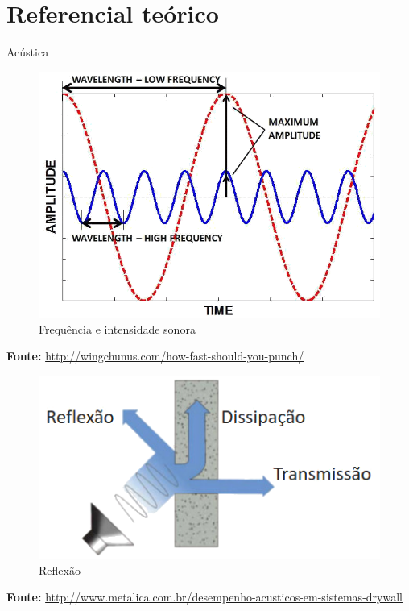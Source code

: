 \section{Referencial teórico}

\begin{frame}[allowframebreaks]{Acústica}  
  \begin{figure}[t]
    \centering
    \includegraphics[height=\dimexpr10\textheight/16\relax]{figuras/wave}
    \caption{Frequência e intensidade sonora}
  \end{figure}
	\begin{center}
	\tiny \textbf{Fonte:} \url{http://wingchunus.com/how-fast-should-you-punch/}
	\end{center}


  \begin{figure}[t]
    \centering
    \includegraphics[height=\dimexpr8\textheight/14\relax]{figuras/reflexao}
    \caption{Reflexão}
  \end{figure}
	\begin{center}
	\tiny \textbf{Fonte:} \url{http://www.metalica.com.br/desempenho-acusticos-em-sistemas-drywall}
	\end{center}


\end{frame}
